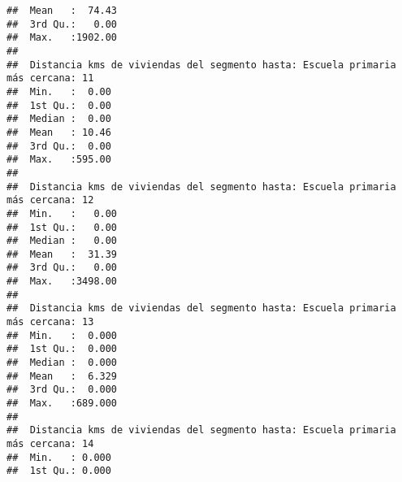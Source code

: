\documentclass[11pt,]{article}
\begin{document}
\begin{verbatim}
##  Mean   :  74.43                                                                
##  3rd Qu.:   0.00                                                                
##  Max.   :1902.00                                                                
##                                                                                 
##  Distancia kms de viviendas del segmento hasta: Escuela primaria más cercana: 11
##  Min.   :  0.00                                                                 
##  1st Qu.:  0.00                                                                 
##  Median :  0.00                                                                 
##  Mean   : 10.46                                                                 
##  3rd Qu.:  0.00                                                                 
##  Max.   :595.00                                                                 
##                                                                                 
##  Distancia kms de viviendas del segmento hasta: Escuela primaria más cercana: 12
##  Min.   :   0.00                                                                
##  1st Qu.:   0.00                                                                
##  Median :   0.00                                                                
##  Mean   :  31.39                                                                
##  3rd Qu.:   0.00                                                                
##  Max.   :3498.00                                                                
##                                                                                 
##  Distancia kms de viviendas del segmento hasta: Escuela primaria más cercana: 13
##  Min.   :  0.000                                                                
##  1st Qu.:  0.000                                                                
##  Median :  0.000                                                                
##  Mean   :  6.329                                                                
##  3rd Qu.:  0.000                                                                
##  Max.   :689.000                                                                
##                                                                                 
##  Distancia kms de viviendas del segmento hasta: Escuela primaria más cercana: 14
##  Min.   : 0.000                                                                 
##  1st Qu.: 0.000                                                                 

\end{verbatim}
\end{document}

